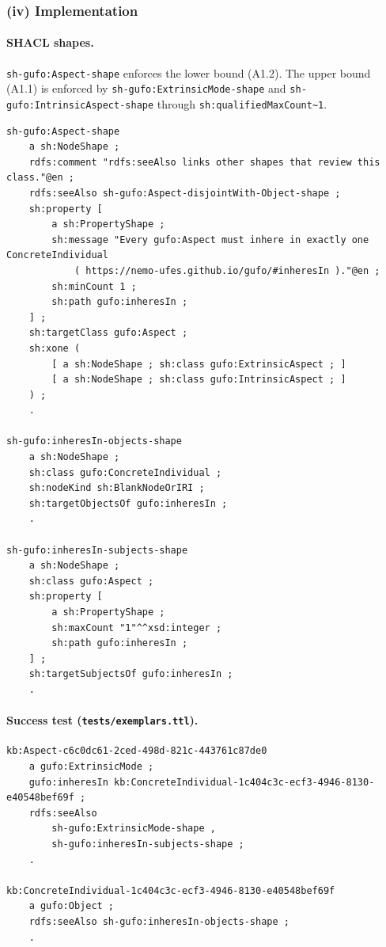 \documentclass[12pt,a4paper]{article}
\newcommand{\shapename}[1]{\nolinkurl{#1}}
\newcommand{\shprop}[1]{\nolinkurl{sh:#1}}
\begin{document}
\subsubsection*{(iv) Implementation}

\paragraph{SHACL shapes.}
\shapename{sh-gufo:Aspect-shape} enforces the lower bound (A1.2).
The upper bound (A1.1) is enforced by \shapename{sh-gufo:ExtrinsicMode-shape}
and \shapename{sh-gufo:IntrinsicAspect-shape} through
\shprop{qualifiedMaxCount~1}.

\begin{lstlisting}[style=turtlestyle,caption={sh-gufo:Aspect-shape with minCount~1}]
sh-gufo:Aspect-shape
    a sh:NodeShape ;
    rdfs:comment "rdfs:seeAlso links other shapes that review this class."@en ;
    rdfs:seeAlso sh-gufo:Aspect-disjointWith-Object-shape ;
    sh:property [
        a sh:PropertyShape ;
        sh:message "Every gufo:Aspect must inhere in exactly one ConcreteIndividual
            ( https://nemo-ufes.github.io/gufo/#inheresIn )."@en ;
        sh:minCount 1 ;
        sh:path gufo:inheresIn ;
    ] ;
    sh:targetClass gufo:Aspect ;
    sh:xone (
        [ a sh:NodeShape ; sh:class gufo:ExtrinsicAspect ; ]
        [ a sh:NodeShape ; sh:class gufo:IntrinsicAspect ; ]
    ) ;
    .

sh-gufo:inheresIn-objects-shape
    a sh:NodeShape ;
    sh:class gufo:ConcreteIndividual ;
    sh:nodeKind sh:BlankNodeOrIRI ;
    sh:targetObjectsOf gufo:inheresIn ;
    .

sh-gufo:inheresIn-subjects-shape
    a sh:NodeShape ;
    sh:class gufo:Aspect ;
    sh:property [
        a sh:PropertyShape ;
        sh:maxCount "1"^^xsd:integer ;
        sh:path gufo:inheresIn ;
    ] ;
    sh:targetSubjectsOf gufo:inheresIn ;
    .
\end{lstlisting}

\paragraph{Success test (\texttt{tests/exemplars.ttl}).}

\begin{lstlisting}[style=turtlestyle]
kb:Aspect-c6c0dc61-2ced-498d-821c-443761c87de0
    a gufo:ExtrinsicMode ;
    gufo:inheresIn kb:ConcreteIndividual-1c404c3c-ecf3-4946-8130-e40548bef69f ;
    rdfs:seeAlso
        sh-gufo:ExtrinsicMode-shape ,
        sh-gufo:inheresIn-subjects-shape ;
    .

kb:ConcreteIndividual-1c404c3c-ecf3-4946-8130-e40548bef69f
    a gufo:Object ;
    rdfs:seeAlso sh-gufo:inheresIn-objects-shape ;
    .
\end{lstlisting}
\end{document}
